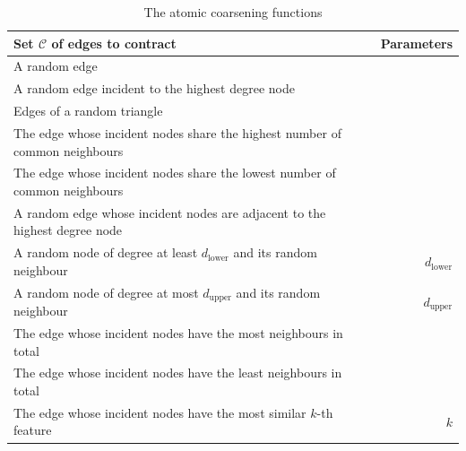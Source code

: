 \begin{table}
  \begin{center}
    \begin{minipage}{\textwidth}
      \caption{The atomic coarsening functions}
      \label{tab:atomic-coarsenings}
      \begin{tabularx}{\textwidth}{Xr}
        \toprule
        \textbf{Set \( \mathcal{C} \) of edges to contract}                                                                     & \textbf{Parameters}    \\
        \midrule
        A random edge                                                                                                           &                        \\
        A random edge incident to the highest degree node                                                                       &                        \\
        Edges of a random triangle                                                                                              &                        \\
        The edge whose incident nodes share the highest number of common neighbours                                             &                        \\
        The edge whose incident nodes share the lowest number of common neighbours                                              &                        \\
        A random edge whose incident nodes are adjacent to the highest degree node                                              &                        \\
        A random node of degree at least \( d_\mathrm{lower} \) and its random neighbour                                        & \( d_\mathrm{lower} \) \\
        A random node of degree at most \( d_\mathrm{upper} \) and its random neighbour                                         & \( d_\mathrm{upper} \) \\
        The edge whose incident nodes have the most neighbours in total                                                         &                        \\
        The edge whose incident nodes have the least neighbours in total                                                        &                        \\
        The edge whose incident nodes have the most similar \( k \)-th feature                                                  & \( k \)                \\

\end{tabularx}
\end{minipage}
\end{center}
\end{table}
